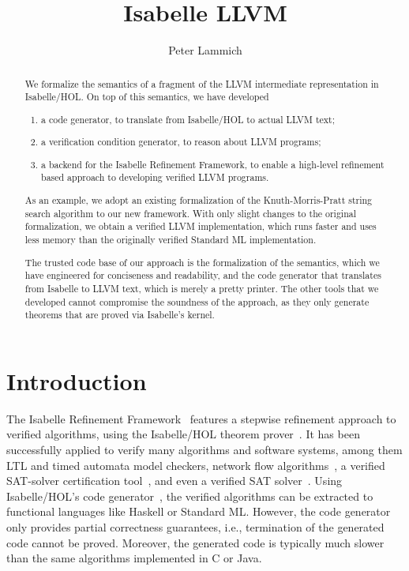 \documentclass[a4paper,oribibl,envcountsame]{llncs}
\begin{document}
\title{Isabelle LLVM}

\author{Peter Lammich}

\maketitle

\setcounter{footnote}{0}

\begin{abstract}
We formalize the semantics of a fragment of the LLVM intermediate representation in Isabelle/HOL.
On top of this semantics, we have developed
\begin{enumerate}
\item a code generator, to translate from Isabelle/HOL to actual LLVM text; 
\item a verification condition generator, to reason about LLVM programs;
\item a backend for the Isabelle Refinement Framework, to enable a high-level refinement based approach to developing verified LLVM programs.
\end{enumerate}
As an example, we adopt an existing formalization of the Knuth-Morris-Pratt string search algorithm to our new framework.
With only slight changes to the original formalization, we obtain a verified LLVM implementation, which runs faster and uses less memory 
than the originally verified Standard ML implementation.

The trusted code base of our approach is the formalization of the semantics, which we have engineered for conciseness and readability, 
and the code generator that translates from Isabelle to LLVM text, which is merely a pretty printer. 
The other tools that we developed cannot compromise the soundness of the approach, as they only generate theorems that are proved via Isabelle's kernel.
\end{abstract}


\section{Introduction}
\label{sec:introduction}
The Isabelle Refinement Framework~\cite{LaTu12,La13} features a stepwise refinement approach to verified algorithms, using the Isabelle/HOL theorem prover~\cite{NPW02,NiKl14}.
It has been successfully applied to verify many algorithms and software systems, 
among them LTL and timed automata model checkers\cite{ELNN13,BrLa18,WiLa18}, network flow algorithms~\cite{LaSe17,LaSe16}, a verified SAT-solver certification tool~\cite{La17_CADE,La17_SAT}, and even a verified SAT solver~\cite{FBL18}.
Using Isabelle/HOL's code generator~\cite{HKKN13}, the verified algorithms can be extracted to functional languages like Haskell or Standard ML.
However, the code generator only provides partial correctness guarantees, i.e., termination of the generated code cannot be proved.
Moreover, the generated code is typically much slower than the same algorithms implemented in C or Java. 
\end{document}
